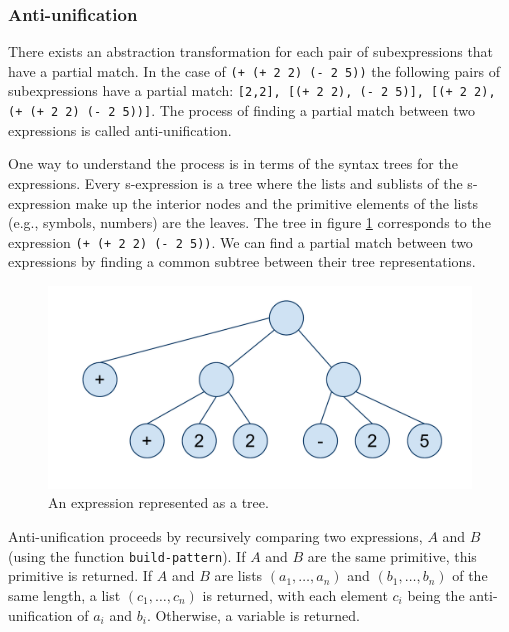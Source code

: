 \documentclass[a4paper,10pt]{article}
\begin{document}
\subsubsection{Anti-unification}

There exists an abstraction transformation for each pair of subexpressions that have a partial match.  In the case of \texttt{(+ (+ 2 2) (- 2 5))} the following pairs of subexpressions have a partial match: \texttt{[2,2], [(+ 2 2), (- 2 5)], [(+ 2 2), (+ (+ 2 2) (- 2 5))]}. The process of finding a partial match between two expressions is called anti-unification.

One way to understand the process is in terms of the syntax trees for the expressions.  Every s-expression is a tree where the lists and sublists of the s-expression make up the interior nodes and the primitive elements of the lists (e.g., symbols, numbers) are the leaves.  The tree in figure \ref{expressionTree} corresponds to the expression \texttt{(+ (+ 2 2) (- 2 5))}. We can find a partial match between two expressions by finding a common subtree between their tree representations.
\begin{figure}[b]
\begin{center}
\includegraphics[scale=.40]{../figures/expressionTree.pdf}
\caption{An expression represented as a tree.}
\label{expressionTree}
\end{center}
\end{figure}

Anti-unification proceeds by recursively comparing two expressions, $A$ and $B$ (using the function \texttt{build-pattern}).  If $A$ and $B$ are the same primitive, this primitive is returned.  If $A$ and $B$ are lists $(a_1,\ldots,a_n)$ and $(b_1,\ldots,b_n)$ of the same length, a list $(c_1,\ldots,c_n)$ is returned, with each element $c_i$ being the anti-unification of $a_i$ and $b_i$.  Otherwise, a variable is returned.
\end{document}
